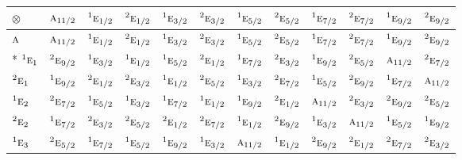 \documentclass[10pt,a4paper]{article}
\numberwithin{equation}{section}
\newcommand{\irr}[1]{\text{\normalfont\scshape #1}}
\newcommand{\conjpair}[1]{{}^{#1}}
\newcommand{\irrprod}{\otimes}
\begin{document}
{\small\setlength{\tabcolsep}{3pt}\begin{longtable}{@{}lccccccccccc@{}}\toprule
$\irrprod$ & $\irr{a}_{11/2}$ & $\conjpair{1}\irr{e}_{1/2}$ & $\conjpair{2}\irr{e}_{1/2}$ & $\conjpair{1}\irr{e}_{3/2}$ & $\conjpair{2}\irr{e}_{3/2}$ & $\conjpair{1}\irr{e}_{5/2}$ & $\conjpair{2}\irr{e}_{5/2}$ & $\conjpair{1}\irr{e}_{7/2}$ & $\conjpair{2}\irr{e}_{7/2}$ & $\conjpair{1}\irr{e}_{9/2}$ & $\conjpair{2}\irr{e}_{9/2}$\\\midrule\endhead
\bottomrule\endfoot\endlastfoot
$\irr{a}$ & $\irr{a}_{11/2}$ & $\conjpair{1}\irr{e}_{1/2}$ & $\conjpair{2}\irr{e}_{1/2}$ & $\conjpair{1}\irr{e}_{3/2}$ & $\conjpair{2}\irr{e}_{3/2}$ & $\conjpair{1}\irr{e}_{5/2}$ & $\conjpair{2}\irr{e}_{5/2}$ & $\conjpair{1}\irr{e}_{7/2}$ & $\conjpair{2}\irr{e}_{7/2}$ & $\conjpair{1}\irr{e}_{9/2}$ & $\conjpair{2}\irr{e}_{9/2}$\\*
$\conjpair{1}\irr{e}_{1}$ & $\conjpair{2}\irr{e}_{9/2}$ & $\conjpair{1}\irr{e}_{3/2}$ & $\conjpair{1}\irr{e}_{1/2}$ & $\conjpair{1}\irr{e}_{5/2}$ & $\conjpair{2}\irr{e}_{1/2}$ & $\conjpair{1}\irr{e}_{7/2}$ & $\conjpair{2}\irr{e}_{3/2}$ & $\conjpair{1}\irr{e}_{9/2}$ & $\conjpair{2}\irr{e}_{5/2}$ & $\irr{a}_{11/2}$ & $\conjpair{2}\irr{e}_{7/2}$\\
$\conjpair{2}\irr{e}_{1}$ & $\conjpair{1}\irr{e}_{9/2}$ & $\conjpair{2}\irr{e}_{1/2}$ & $\conjpair{2}\irr{e}_{3/2}$ & $\conjpair{1}\irr{e}_{1/2}$ & $\conjpair{2}\irr{e}_{5/2}$ & $\conjpair{1}\irr{e}_{3/2}$ & $\conjpair{2}\irr{e}_{7/2}$ & $\conjpair{1}\irr{e}_{5/2}$ & $\conjpair{2}\irr{e}_{9/2}$ & $\conjpair{1}\irr{e}_{7/2}$ & $\irr{a}_{11/2}$\\
$\conjpair{1}\irr{e}_{2}$ & $\conjpair{2}\irr{e}_{7/2}$ & $\conjpair{1}\irr{e}_{5/2}$ & $\conjpair{1}\irr{e}_{3/2}$ & $\conjpair{1}\irr{e}_{7/2}$ & $\conjpair{1}\irr{e}_{1/2}$ & $\conjpair{1}\irr{e}_{9/2}$ & $\conjpair{2}\irr{e}_{1/2}$ & $\irr{a}_{11/2}$ & $\conjpair{2}\irr{e}_{3/2}$ & $\conjpair{2}\irr{e}_{9/2}$ & $\conjpair{2}\irr{e}_{5/2}$\\
$\conjpair{2}\irr{e}_{2}$ & $\conjpair{1}\irr{e}_{7/2}$ & $\conjpair{2}\irr{e}_{3/2}$ & $\conjpair{2}\irr{e}_{5/2}$ & $\conjpair{2}\irr{e}_{1/2}$ & $\conjpair{2}\irr{e}_{7/2}$ & $\conjpair{1}\irr{e}_{1/2}$ & $\conjpair{2}\irr{e}_{9/2}$ & $\conjpair{1}\irr{e}_{3/2}$ & $\irr{a}_{11/2}$ & $\conjpair{1}\irr{e}_{5/2}$ & $\conjpair{1}\irr{e}_{9/2}$\\
$\conjpair{1}\irr{e}_{3}$ & $\conjpair{2}\irr{e}_{5/2}$ & $\conjpair{1}\irr{e}_{7/2}$ & $\conjpair{1}\irr{e}_{5/2}$ & $\conjpair{1}\irr{e}_{9/2}$ & $\conjpair{1}\irr{e}_{3/2}$ & $\irr{a}_{11/2}$ & $\conjpair{1}\irr{e}_{1/2}$ & $\conjpair{2}\irr{e}_{9/2}$ & $\conjpair{2}\irr{e}_{1/2}$ & $\conjpair{2}\irr{e}_{7/2}$ & $\conjpair{2}\irr{e}_{3/2}$\\

\end{longtable}}
\end{document}
